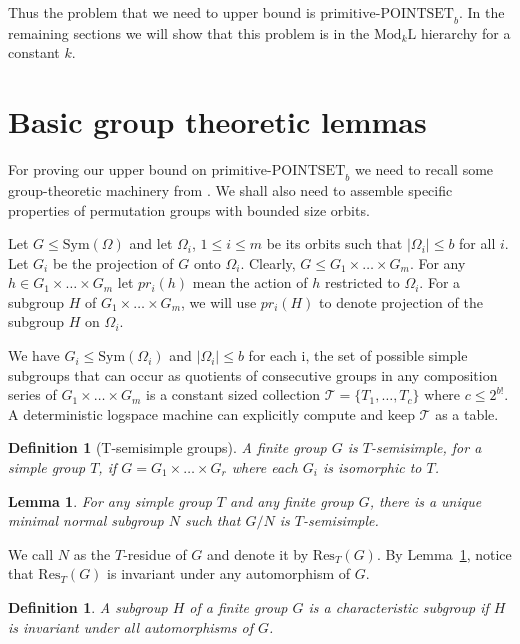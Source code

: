 \documentclass[11pt]{article}
\newtheorem{lemma}[theorem]{Lemma}
\newtheorem{definition}[theorem]{Definition}
\newcommand{\Mod}[1]{\ensuremath{\mathrm{Mod}_{#1}\mathrm{L}}}
\newcommand{\prpsb}[1]{\ensuremath{\textrm{primitive-POINTSET}_{#1}}}
\renewcommand{\Res}[2]{\ensuremath{\mathrm{Res}_{#1}\left({#2}\right)}}
\newcommand{\Sym}[1]{\ensuremath{\mathrm{Sym}\left({#1}\right)}}
\newcommand{\pr}[2]{\ensuremath{pr_{#1}\left({#2}\right)}}
\begin{document}
Thus the problem that we need to upper bound is $\prpsb{b}$.  In the
remaining sections we will show that this problem is in the $\Mod{k}$
hierarchy for a constant $k$.
 
\section{Basic group theoretic lemmas}

For proving our upper bound on $\prpsb{b}$ we need to recall some
group-theoretic machinery from \cite{luks}. We shall also need to
assemble specific properties of permutation groups with bounded size
orbits.

Let $G \leq \Sym{\Omega}$ and let $\Omega_i$, $1 \leq i \leq m$ be its
orbits such that $\vert \Omega_i \vert \leq b$ for all $i$. Let $G_i$
be the projection of $G$ onto $\Omega_i$. Clearly, $G \leq G_1\times
\ldots\times G_m$. For any $h \in G_1 \times \ldots \times G_m$ let
$\pr{i}{h}$ mean the action of $h$ restricted to $\Omega_i$. For a
subgroup $H$ of $G_1 \times \ldots \times G_m$, we will use
$\pr{i}{H}$ to denote projection of the subgroup $H$ on $\Omega_i$.

We have $G_i \leq \Sym{\Omega_i}$ and $\vert \Omega_i \vert \leq b$
for each i, the set of possible simple subgroups that can occur as
quotients of consecutive groups in any composition series of
$G_1\times \ldots \times G_m$ is a constant sized collection
$\mathcal{T} = \{ T_1,\ldots, T_c\}$ where $ c \leq 2 ^{b!}$. A
deterministic logspace machine can explicitly compute and keep
$\mathcal{T}$ as a table.

\begin{definition}[T-semisimple groups]
  A finite group $G$ is \emph{$T$-semisimple}, for a simple group $T$,
  if $G = G_1 \times \ldots\times G_r$ where each $G_i$ is isomorphic
  to $T$.
\end{definition}

\begin{lemma}{\rm\cite{luks}}\label{lem-unique-res}
  For any simple group $T$ and any finite group $G$, there is a unique
  minimal normal subgroup $N$ such that $G/N$ is $T$-semisimple.
\end{lemma}

 We call $N$ as the $T$-residue of $G$ and denote it by $\Res{T}{G}$.
By Lemma~\ref{lem-unique-res}, notice that $\Res{T}{G}$ is invariant
under any automorphism of $G$.

\begin{definition}
  A subgroup $H$ of a finite group $G$ is a \emph{characteristic subgroup} if
  $H$ is invariant under all automorphisms of $G$.
\end{definition}
\end{document}
